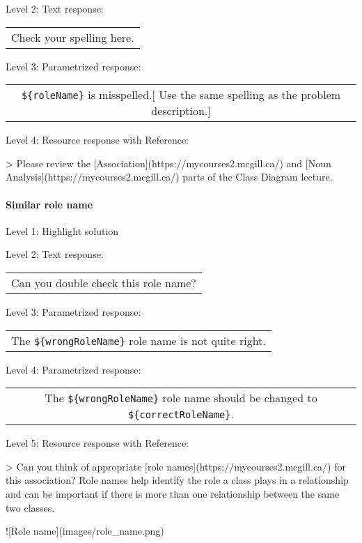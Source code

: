 \noindent Level 2: Text response: \medskip

\begin{tabular}{|c}
Check your spelling here.
\end{tabular} \medskip

\noindent Level 3: Parametrized response: \medskip

\begin{tabular}{|c}
\verb|${roleName}| is misspelled.[ Use the same spelling as the problem description.]
\end{tabular} \medskip

\noindent Level 4: Resource response with Reference:

> Please review the [Association](https://mycourses2.mcgill.ca/) and [Noun Analysis](https://mycourses2.mcgill.ca/) parts of the Class Diagram lecture.


\paragraph{Similar role name}

\noindent Level 1: Highlight solution \medskip

\noindent Level 2: Text response: \medskip

\begin{tabular}{|c}
Can you double check this role name?
\end{tabular} \medskip

\noindent Level 3: Parametrized response: \medskip

\begin{tabular}{|c}
The \verb|${wrongRoleName}| role name is not quite right.
\end{tabular} \medskip

\noindent Level 4: Parametrized response: \medskip

\begin{tabular}{|c}
The \verb|${wrongRoleName}| role name should be changed to \verb|${correctRoleName}|.
\end{tabular} \medskip

\noindent Level 5: Resource response with Reference:

> Can you think of appropriate [role names](https://mycourses2.mcgill.ca/)
for this association? Role names help identify the role a class plays in a
relationship and can be important if there is more than one relationship
between the same two classes.

![Role name](images/role_name.png)



